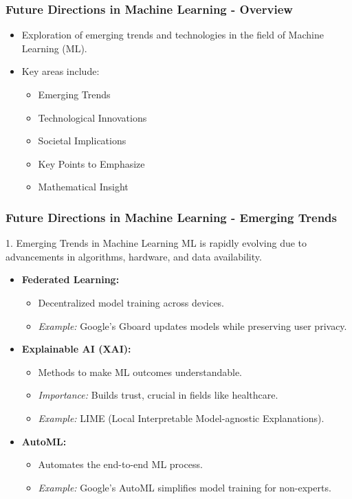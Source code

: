 \documentclass[aspectratio=169]{beamer}
\begin{document}
\begin{frame}[fragile]
    \frametitle{Future Directions in Machine Learning - Overview}
    \begin{itemize}
        \item Exploration of emerging trends and technologies in the field of Machine Learning (ML).
        \item Key areas include:
        \begin{itemize}
            \item Emerging Trends
            \item Technological Innovations
            \item Societal Implications
            \item Key Points to Emphasize
            \item Mathematical Insight
        \end{itemize}
    \end{itemize}
\end{frame}

\begin{frame}[fragile]
    \frametitle{Future Directions in Machine Learning - Emerging Trends}
    \begin{block}{1. Emerging Trends in Machine Learning}
        ML is rapidly evolving due to advancements in algorithms, hardware, and data availability. 
    \end{block}
    \begin{itemize}
        \item \textbf{Federated Learning:}
        \begin{itemize}
            \item Decentralized model training across devices.
            \item \textit{Example:} Google’s Gboard updates models while preserving user privacy.
        \end{itemize}
        
        \item \textbf{Explainable AI (XAI):}
        \begin{itemize}
            \item Methods to make ML outcomes understandable.
            \item \textit{Importance:} Builds trust, crucial in fields like healthcare.
            \item \textit{Example:} LIME (Local Interpretable Model-agnostic Explanations).
        \end{itemize}
        
        \item \textbf{AutoML:}
        \begin{itemize}
            \item Automates the end-to-end ML process.
            \item \textit{Example:} Google’s AutoML simplifies model training for non-experts.
        \end{itemize}
    \end{itemize}
\end{frame}
\end{document}
